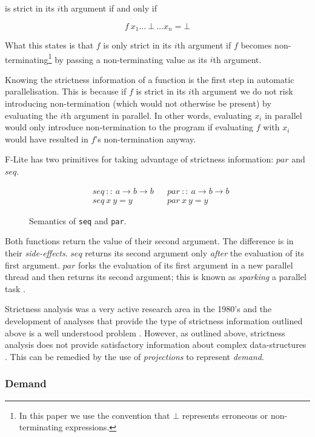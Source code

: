 \noindent is strict in its $i$th argument if and only if

$$
    f\ x_{1} \dots \ \bot \ \dots x_{n} = \bot
$$

What this states is that $f$ is only strict in its $i$th argument if $f$
becomes non-terminating\footnote{In this paper we use the convention that
$\bot$ represents erroneous or non-terminating expressions.} by passing a
non-terminating value as its $i$th argument.

Knowing the strictness information of a function is the first step in automatic
parallelisation. This is because if $f$ is strict in its $i$th argument we do
not risk introducing non-termination (which would not otherwise be present) by
evaluating the $i$th argument in parallel. In other words, evaluating $x_{i}$ in
parallel would only introduce non-termination to the program if evaluating $f$
with $x_{i}$ would have resulted in $f$'s non-termination anyway.

F-Lite has two primitives for taking advantage of strictness information: $par$
and $seq$.
\begin{figure}
\begin{align*}
    &seq \ :: \ a \rightarrow b \rightarrow b &&par \ :: \ a \rightarrow b \rightarrow b \\
    &seq \ x \ y = y                          &&par \ x \ y = y
\end{align*}
\caption{Semantics of \texttt{seq} and \texttt{par}.}
\label{fig:seqandpar}
\end{figure}

Both functions return the value of their second argument. The difference is in
their \emph{side-effects}. $seq$ returns its second argument only \emph{after}
the evaluation of its first argument. $par$ forks the evaluation of its first
argument in a new parallel thread and then returns its second argument; this is
known as \emph{sparking} a parallel task \citep{clack1986four}.

Strictness analysis was a very active research area in the 1980's and the
development of analyses that provide the type of strictness information
outlined above is a well understood problem \citep{mycroft1980theory,
clack1985strictness, burn1986strictness}.  However, as outlined above,
strictness analysis does not provide satisfactory information about complex
data-structures \citep{wadler1987strictness}. This can be remedied by the
use of \emph{projections} to represent \emph{demand}.

\subsubsection*{Demand}

